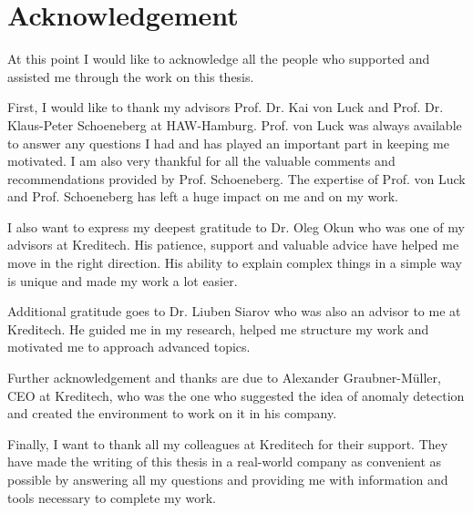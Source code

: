 \documentclass[draft=false
              ,paper=a4
              ,twoside=false
              ,fontsize=11pt
              ,headsepline
              ,BCOR10mm
              ,DIV11
              ]{scrbook}
\begin{document}
\newpage
\singlespacing
\section*{Acknowledgement}
At this point I would like to acknowledge all the people who supported and assisted me through the work on this thesis.

First, I would like to thank my advisors Prof. Dr. Kai von Luck and Prof. Dr. Klaus-Peter Schoeneberg at HAW-Hamburg. Prof. von Luck was always available to answer any questions I had and has played an important part in keeping me motivated. I am also very thankful for all the valuable comments and recommendations provided by Prof. Schoeneberg. The expertise of Prof. von Luck and Prof. Schoeneberg has left a huge impact on me and on my work. 

I also want to express my deepest gratitude to Dr. Oleg Okun who was one of my advisors at Kreditech. His patience, support and valuable advice have helped me move in the right direction. His ability to explain complex things in a simple way is unique and made my work a lot easier.

Additional gratitude goes to Dr. Liuben Siarov who was also an advisor to me at Kreditech. He guided me in my research, helped me structure my work and motivated me to approach advanced topics.

Further acknowledgement and thanks are due to Alexander Graubner-Müller, CEO at Kreditech, who was the one who suggested the idea of anomaly detection and created the environment to work on it in his company.

Finally, I want to thank all my colleagues at Kreditech for their support. They have made the writing of this thesis in a real-world company as convenient as possible by answering all my questions and providing me with information and tools necessary to complete my work.



\tableofcontents
\newpage
\listoftables
\listoffigures

\mainmatter
\onehalfspacing







\end{document}
